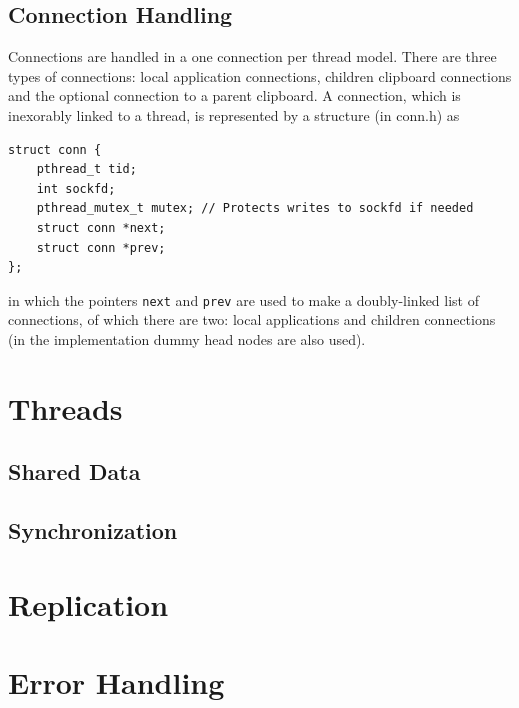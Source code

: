 \documentclass[a4paper, titlepage, english]{article}
\begin{document}
	\subsection{Connection Handling}
	\par
	Connections are handled in a one connection per thread model. There are three types of connections: local application connections, children clipboard connections and the optional connection to a parent clipboard. A connection, which is inexorably linked to a thread, is represented by a structure (in conn.h) as

	\begin{lstlisting}
struct conn {
	pthread_t tid;
	int sockfd;
	pthread_mutex_t mutex; // Protects writes to sockfd if needed
	struct conn *next;
	struct conn *prev;
};
	\end{lstlisting}
	in which the pointers \texttt{next} and \texttt{prev} are used to make a doubly-linked list of connections, of which there are two: local applications and children connections (in the implementation dummy head nodes are also used).

	\section{Threads}
	\subsection{Shared Data}
	\subsection{Synchronization}

	\section{Replication}

	\section{Error Handling}



\end{document}
